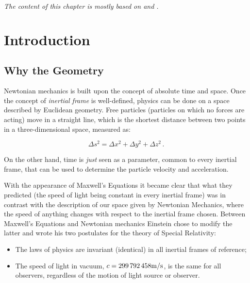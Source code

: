 
\textit{The content of this chapter is mostly based on
 and .}


\section{Introduction}

\subsection{Why the \Sh Geometry}

Newtonian mechanics is built upon the concept of absolute time and space.
Once the concept of \textit{inertial frame} is well-defined, physics can be
done on a space described by Euclidean geometry.
Free particles (particles on which no forces are acting) move in a straight
line, which is the shortest distance between two points in a three-dimensional
space, measured as:

\begin{equation}
    \Delta s^2 = \Delta x^2 + \Delta y^2 + \Delta z^2 \, .
    \label{cap1:eq:euclide}
\end{equation}

On the other hand, time is \textit{just} seen as a parameter, common to every 
inertial frame, that can be used to determine the particle velocity and
acceleration.

With the appearance of Maxwell's Equations it became clear that what they 
predicted (the speed of light being constant in every inertial frame) was in
contrast with the description of our space given by Newtonian Mechanics, where
the speed of anything changes with respect to the inertial frame chosen.
Between Maxwell's Equations and Newtonian mechanics Einstein chose to modify 
the latter and wrote his two postulates for the theory of Special Relativity:

\begin{itemize}
    \item The laws of physics are invariant (identical) in all inertial frames
        of reference;
    \item The speed of light in vacuum,
        $c = \num{299792458} \unit[per-mode = symbol]{\meter\per\second}$,
        is the same for all observers, regardless of the motion of light source
        or observer.
\end{itemize}

